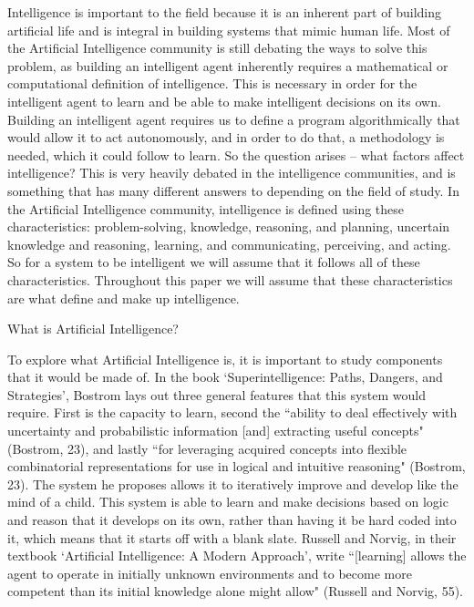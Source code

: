 \documentclass[11pt]{article}
\begin{document}
\par Intelligence is important to the field because it is an inherent part of building artificial life and is integral in building systems that mimic human life. Most of the Artificial Intelligence community is still debating the ways to solve this problem, as building an intelligent agent inherently requires a mathematical or computational definition of intelligence. This is necessary in order for the intelligent agent to learn and be able to make intelligent decisions on its own. Building an intelligent agent requires us to define a program algorithmically that would allow it to act autonomously, and in order to do that, a methodology is needed, which it could follow to learn. So the question arises -- what factors affect intelligence? This is very heavily debated in the intelligence communities, and is something that has many different answers to depending on the field of study. In the Artificial Intelligence community, intelligence is defined using these characteristics: problem-solving, knowledge, reasoning, and planning, uncertain knowledge and reasoning, learning, and communicating, perceiving, and acting. So for a system to be intelligent we will assume that it follows all of these characteristics. Throughout this paper we will assume that these characteristics are what define and make up intelligence.

\begin{center}
	{\large What is Artificial Intelligence?\par}
\end{center}
\par To explore what Artificial Intelligence is, it is important to study components that it would be made of. In the book `Superintelligence: Paths, Dangers, and Strategies', Bostrom lays out three general features that this system would require. First is the capacity to learn, second the ``ability to deal effectively with uncertainty and probabilistic information [and] extracting useful concepts" (Bostrom, 23), and lastly ``for leveraging acquired concepts into flexible combinatorial representations for use in logical and intuitive reasoning" (Bostrom, 23). The system he proposes allows it to iteratively improve and develop like the mind of a child. This system is able to learn and make decisions based on logic and reason that it develops on its own, rather than having it be hard coded into it, which means that it starts off with a blank slate. Russell and Norvig, in their textbook `Artificial Intelligence: A Modern Approach', write ``[learning] allows the agent to operate in initially unknown environments and to become more competent than its initial knowledge alone might allow" (Russell and Norvig, 55).
\end{document}
